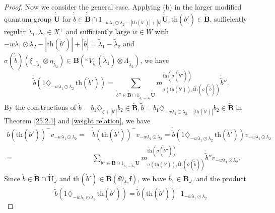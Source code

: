 \documentclass[10pt,a4paper]{amsart}
\begin{document}
\begin{proof}
Now we consider the general case. Applying (b) in the larger modified quantum group $\dot{\tilde{\mathbf{U}}}$ for $\dot{\tilde{b}}\in \dot{\tilde{\mathbf{B}}}\cap 1_{-w\lambda_1\odot\lambda_2-|\mathrm{th}(\dot{b}')|+|\dot{b}|}\dot{\tilde{\mathbf{U}}},\mathrm{th}(\dot{b}')\in \tilde{\mathbf{B}}$, sufficiently regular $\tilde{\lambda}_1,\tilde{\lambda}_2\in X^+$ and sufficiently large $\tilde{w}\in \tilde{W}$ with $-w\lambda_1\odot\lambda_2-|\mathrm{th}(\dot{b}')|+|\dot{b}|=\tilde{\lambda}_1-\tilde{\lambda}_2$ and $\sigma(\dot{\tilde{b}})(\xi_{-\tilde{\lambda}_1}\otimes \eta_{\tilde{\lambda}_2})\in \mathbf{B}({^{\omega}V_{\tilde{w}}(\tilde{\lambda}_1)\otimes \Lambda_{\tilde{\lambda}_2}})$, we have  
$$\dot{\tilde{b}}(1\diamondsuit_{-w\lambda_1\odot\lambda_2}\,\mathrm{th}(\dot{b}'))=\sum_{\dot{\tilde{b}}''\in \dot{\tilde{\mathbf{B}}}\cap 1_{\tilde{\lambda}_1-\tilde{\lambda}_2}\dot{\tilde{\mathbf{U}}}} m_{\sigma(\mathrm{th}(\dot{b}')),\widetilde{\mathrm{th}}(\sigma(\dot{\tilde{b}}))}^{\widetilde{\mathrm{th}}(\sigma(\dot{\tilde{b}}''))}\dot{\tilde{b}}''.$$ 
By the constructions of $\dot{b}=b_1\diamondsuit_{\zeta+|\dot{b}'|}b_2\in \dot{\mathbf{B}},\dot{\tilde{b}}=b_1\diamondsuit_{-w\lambda_1\odot\lambda_2-|\mathrm{th}(\dot{b}')|}b_2\in \dot{\tilde{\mathbf{B}}}$ in Theorem \ref{25.2.1} and \eqref{weight relation}, we have  
\begin{equation}\label{the product acts on Verma}
\begin{aligned}
\dot{b}(\mathrm{th}(\dot{b}'))^-v_{-w\lambda_1\odot\lambda_2}=&\dot{\tilde{b}}(\mathrm{th}(\dot{b}'))^-v_{-w\lambda_1\odot\lambda_2}=\dot{\tilde{b}}(1\diamondsuit_{-w\lambda_1\odot\lambda_2}\,\mathrm{th}(\dot{b}'))v_{-w\lambda_1\odot\lambda_2}\\
=&\sum_{\dot{\tilde{b}}''\in \dot{\tilde{\mathbf{B}}}\cap 1_{\tilde{\lambda}_1-\tilde{\lambda}_2}\dot{\tilde{\mathbf{U}}}} m_{\sigma(\mathrm{th}(\dot{b}')),\widetilde{\mathrm{th}}(\sigma(\dot{\tilde{b}}))}^{\widetilde{\mathrm{th}}(\sigma(\dot{\tilde{b}}''))}\dot{\tilde{b}}''v_{-w\lambda_1\odot\lambda_2}. 
\end{aligned}
\end{equation}
Since $\dot{b}\in \dot{\mathbf{B}}\cap\dot{\mathbf{U}}_J$ and $\mathrm{th}(\dot{b}')\in \mathbf{B}(\mathbf{f}\theta_{\lambda_2}\mathbf{f})$, we have $b_1\in \mathbf{B}_J$, and the product
$$\dot{\tilde{b}}(1\diamondsuit_{-w\lambda_1\odot\lambda_2}\,\mathrm{th}(\dot{b}'))=\dot{\tilde{b}}(\mathrm{th}(\dot{b}'))^-1_{-w\lambda_1\odot\lambda_2}$$

\end{proof}
\end{document}
